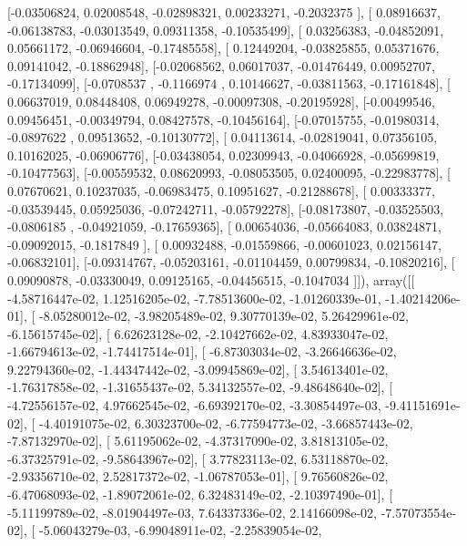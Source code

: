 \documentclass{article}
\begin{document}
       [-0.03506824,  0.02008548, -0.02898321,  0.00233271, -0.2032375 ],
       [ 0.08916637, -0.06138783, -0.03013549,  0.09311358, -0.10535499],
       [ 0.03256383, -0.04852091,  0.05661172, -0.06946604, -0.17485558],
       [ 0.12449204, -0.03825855,  0.05371676,  0.09141042, -0.18862948],
       [-0.02068562,  0.06017037, -0.01476449,  0.00952707, -0.17134099],
       [-0.0708537 , -0.1166974 ,  0.10146627, -0.03811563, -0.17161848],
       [ 0.06637019,  0.08448408,  0.06949278, -0.00097308, -0.20195928],
       [-0.00499546,  0.09456451, -0.00349794,  0.08427578, -0.10456164],
       [-0.07015755, -0.01980314, -0.0897622 ,  0.09513652, -0.10130772],
       [ 0.04113614, -0.02819041,  0.07356105,  0.10162025, -0.06906776],
       [-0.03438054,  0.02309943, -0.04066928, -0.05699819, -0.10477563],
       [-0.00559532,  0.08620993, -0.08053505,  0.02400095, -0.22983778],
       [ 0.07670621,  0.10237035, -0.06983475,  0.10951627, -0.21288678],
       [ 0.00333377, -0.03539445,  0.05925036, -0.07242711, -0.05792278],
       [-0.08173807, -0.03525503, -0.0806185 , -0.04921059, -0.17659365],
       [ 0.00654036, -0.05664083,  0.03824871, -0.09092015, -0.1817849 ],
       [ 0.00932488, -0.01559866, -0.00601023,  0.02156147, -0.06832101],
       [-0.09314767, -0.05203161, -0.01104459,  0.00799834, -0.10820216],
       [ 0.09090878, -0.03330049,  0.09125165, -0.04456515, -0.1047034 ]]), array([[ -4.58716447e-02,   1.12516205e-02,  -7.78513600e-02,
         -1.01260339e-01,  -1.40214206e-01],
       [ -8.05280012e-02,  -3.98205489e-02,   9.30770139e-02,
          5.26429961e-02,  -6.15615745e-02],
       [  6.62623128e-02,  -2.10427662e-02,   4.83933047e-02,
         -1.66794613e-02,  -1.74417514e-01],
       [ -6.87303034e-02,  -3.26646636e-02,   9.22794360e-02,
         -1.44347442e-02,  -3.09945869e-02],
       [  3.54613401e-02,  -1.76317858e-02,  -1.31655437e-02,
          5.34132557e-02,  -9.48648640e-02],
       [ -4.72556157e-02,   4.97662545e-02,  -6.69392170e-02,
         -3.30854497e-03,  -9.41151691e-02],
       [ -4.40191075e-02,   6.30323700e-02,  -6.77594773e-02,
         -3.66857443e-02,  -7.87132970e-02],
       [  5.61195062e-02,  -4.37317090e-02,   3.81813105e-02,
         -6.37325791e-02,  -9.58643967e-02],
       [  3.77823113e-02,   6.53118870e-02,  -2.93356710e-02,
          2.52817372e-02,  -1.06787053e-01],
       [  9.76560826e-02,  -6.47068093e-02,  -1.89072061e-02,
          6.32483149e-02,  -2.10397490e-01],
       [ -5.11199789e-02,  -8.01904497e-03,   7.64337336e-02,
          2.14166098e-02,  -7.57073554e-02],
       [ -5.06043279e-03,  -6.99048911e-02,  -2.25839054e-02,
\end{document}
